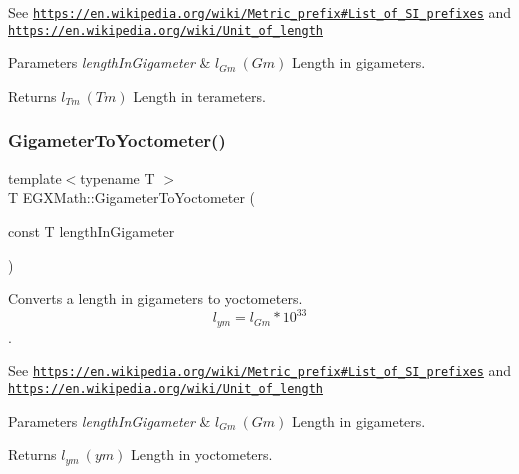 See \href{https://en.wikipedia.org/wiki/Metric_prefix#List_of_SI_prefixes}{\tt https\+://en.\+wikipedia.\+org/wiki/\+Metric\+\_\+prefix\#\+List\+\_\+of\+\_\+\+S\+I\+\_\+prefixes} and \href{https://en.wikipedia.org/wiki/Unit_of_length}{\tt https\+://en.\+wikipedia.\+org/wiki/\+Unit\+\_\+of\+\_\+length} 
\begin{DoxyParams}{Parameters}
{\em length\+In\+Gigameter} & $ l_{Gm}\ (Gm)$ Length in gigameters. \\
\hline
\end{DoxyParams}
\begin{DoxyReturn}{Returns}
$ l_{Tm}\ (Tm)$ Length in terameters. 
\end{DoxyReturn}
\mbox{\label{group___e_g_x_math-_conversions-_length_conversions-_gigameter-_s_i_ga2eff69e0a00032c24617fde4ac30bd49}} 
\subsubsection{\texorpdfstring{Gigameter\+To\+Yoctometer()}{GigameterToYoctometer()}}
{\footnotesize\ttfamily template$<$typename T $>$ \\
T E\+G\+X\+Math\+::\+Gigameter\+To\+Yoctometer (\begin{DoxyParamCaption}\item[{const T}]{length\+In\+Gigameter }\end{DoxyParamCaption})}



Converts a length in gigameters to yoctometers. \[ l_{ym}=l_{Gm} * 10^{33} \]. 

See \href{https://en.wikipedia.org/wiki/Metric_prefix#List_of_SI_prefixes}{\tt https\+://en.\+wikipedia.\+org/wiki/\+Metric\+\_\+prefix\#\+List\+\_\+of\+\_\+\+S\+I\+\_\+prefixes} and \href{https://en.wikipedia.org/wiki/Unit_of_length}{\tt https\+://en.\+wikipedia.\+org/wiki/\+Unit\+\_\+of\+\_\+length} 
\begin{DoxyParams}{Parameters}
{\em length\+In\+Gigameter} & $ l_{Gm}\ (Gm)$ Length in gigameters. \\
\hline
\end{DoxyParams}
\begin{DoxyReturn}{Returns}
$ l_{ym}\ (ym)$ Length in yoctometers. 
\end{DoxyReturn}
\mbox{\label{group___e_g_x_math-_conversions-_length_conversions-_gigameter-_s_i_ga311d6ae40f97487de660c9fb0310ec5e}} 
